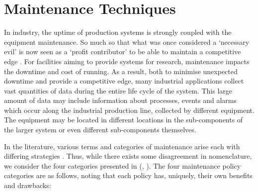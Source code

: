 \documentclass[10pt,oneside]{report}
\renewcommand{\citet}[1]{\citeauthor{#1}, \citeyear{#1}}
\begin{document}


\section{Maintenance Techniques}\label{sec:maintenanceTechniques}
In industry, the uptime of production systems is strongly coupled with the equipment maintenance. So much so that what was once considered a `necessary evil' is now seen as a `profit contributor' to be able to maintain a competitive edge \cite{waeyenbergh2002framework, faccio2014industrial}. For facilities aiming to provide systems for research, maintenance impacts the downtime and cost of running. As a result, both to minimise unexpected downtime and provide a competitive edge, many industrial applications collect vast quantities of data during the entire life cycle of the system. This large amount of data may include information about processes, events and alarms \cite{carvalho2019systematic} which occur along the industrial production line, collected by different equipment. The equipment may be located in different locations in the sub-components of the larger system or even different sub-components themselves. 


In the literature, various terms and categories of maintenance arise each with differing strategies \cite{susto2012predictive, mobley2002introduction, susto2016dealing}. Thus, while there exists some disagreement in nomenclature, we consider the four categories presented in (\citet{susto2012predictive}). The four maintenance policy categories are as follows, noting that each policy has, uniquely, their own benefits and drawbacks:
\end{document}
